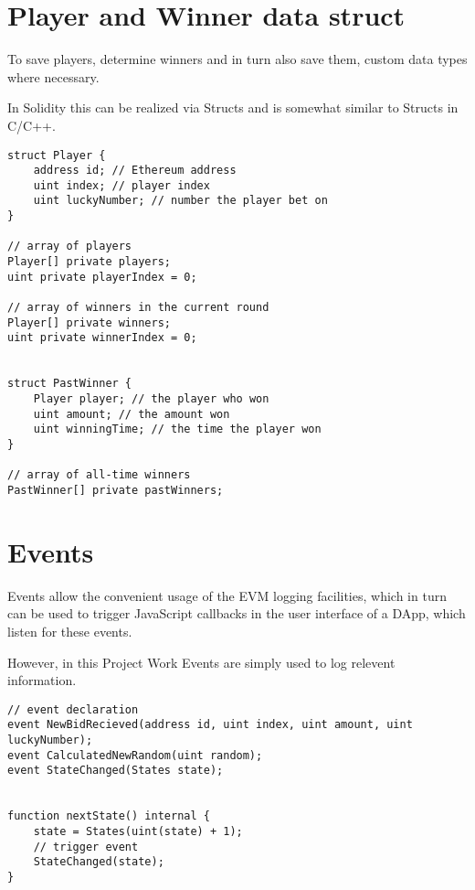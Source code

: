\section{Player and Winner data struct}\label{sec:structs}

To save players, determine winners and in turn also save them, custom data types where necessary.

In Solidity this can be realized via Structs and is somewhat similar to Structs in C/C++.

\begin{lstlisting}[language=Solidity]
struct Player {
    address id; // Ethereum address
    uint index; // player index
    uint luckyNumber; // number the player bet on
}

// array of players
Player[] private players;
uint private playerIndex = 0;

// array of winners in the current round
Player[] private winners;
uint private winnerIndex = 0;


struct PastWinner {
    Player player; // the player who won
    uint amount; // the amount won
    uint winningTime; // the time the player won
}

// array of all-time winners
PastWinner[] private pastWinners;
\end{lstlisting}


\section{Events}\label{sec:events}

Events allow the convenient usage of the \ac{EVM} logging facilities, which in turn can be used to trigger JavaScript callbacks in the user interface of a \ac{DApp}, which listen for these events.

However, in this Project Work Events are simply used to log relevent information.


\begin{lstlisting}[language=Solidity]
// event declaration
event NewBidRecieved(address id, uint index, uint amount, uint luckyNumber);
event CalculatedNewRandom(uint random);
event StateChanged(States state);


function nextState() internal {
    state = States(uint(state) + 1);
    // trigger event
    StateChanged(state);
}
\end{lstlisting}

\chapterend

